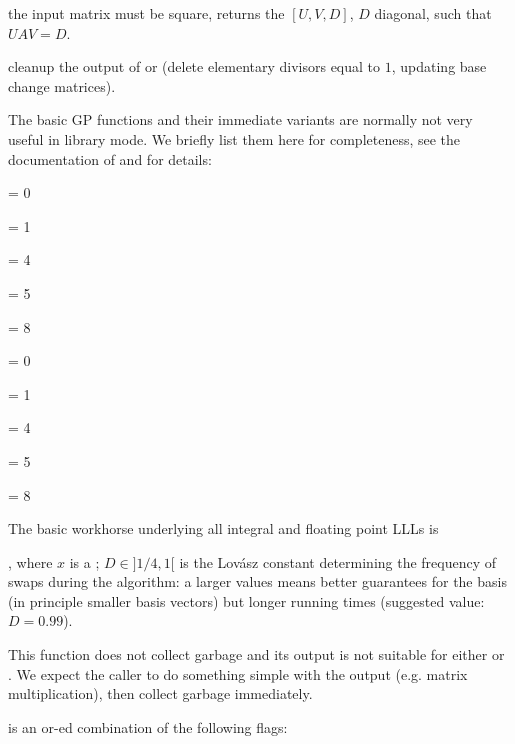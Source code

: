  the input matrix must be square, returns the
$[U,V,D]$, $D$ diagonal, such that $UAV = D$.

 cleanup the output of  or
 (delete elementary divisors equal to $1$, updating base
change matrices).


The basic GP functions and their immediate variants are normally not very
useful in library mode. We briefly list them here for completeness, see the
documentation of  and  for details:

\item {}

 \fl = 0

 \fl = 1

 \fl = 4

 \fl = 5

 \fl = 8

\item {}

 \fl = 0

 \fl = 1

 \fl = 4

 \fl = 5

 \fl = 8

\smallskip

The basic workhorse underlying all integral and floating point LLLs is

, where $x$ is a ;
$D \in ]1/4,1[$ is the Lov\'{a}sz constant determining the frequency of
swaps during the algorithm: a larger values means better guarantees for
the basis (in principle smaller basis vectors) but longer running times
(suggested value: $D = 0.99$).

 This function does not collect garbage and its output
is not suitable for either  or . We expect
the caller to do something simple with the output (e.g. matrix
multiplication), then collect garbage immediately.

\noindent{} is an or-ed combination of the following flags:

